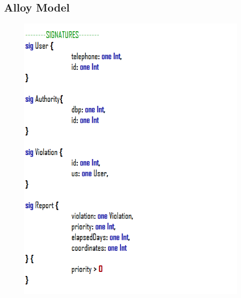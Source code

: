 \documentclass[12pt,a4paper]{article}
\begin{document}
\subsection{Alloy Model}
\begin{figure}[H]
				\centering
				\includegraphics[width=1\linewidth]{../assets/images/exports/user/Sig 1.png}
				\label{fig:signatures}
			\end{figure}
\end{document}
